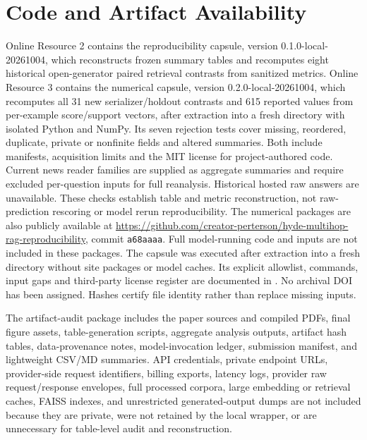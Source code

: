 \documentclass[pdflatex,sn-basic,Numbered]{sn-jnl}
\begin{document}
\FloatBarrier
\section{Code and Artifact Availability}
\label{sec:supp_code_artifact_availability}

Online Resource 2 contains the reproducibility capsule, version 0.1.0-local-20261004, which reconstructs frozen summary tables and recomputes eight historical open-generator paired retrieval contrasts from sanitized metrics. Online Resource 3 contains the numerical capsule, version 0.2.0-local-20261004, which recomputes all 31 new serializer/holdout contrasts and 615 reported values from per-example score/support vectors, after extraction into a fresh directory with isolated Python and NumPy. Its seven rejection tests cover missing, reordered, duplicate, private or nonfinite fields and altered summaries. Both include manifests, acquisition limits and the MIT license for project-authored code. Current news reader families are supplied as aggregate summaries and require excluded per-question inputs for full reanalysis. Historical hosted raw answers are unavailable. These checks establish table and metric reconstruction, not raw-prediction rescoring or model rerun reproducibility. The numerical packages are also publicly available at \url{https://github.com/creator-perterson/hyde-multihop-rag-reproducibility}, commit \texttt{a68aaaa}. Full model-running code and inputs are not included in these packages. The capsule was executed after extraction into a fresh directory without site packages or model caches. Its explicit allowlist, commands, input gaps and third-party license register are documented in . No archival DOI has been assigned. Hashes certify file identity rather than replace missing inputs.

The artifact-audit package includes the paper sources and compiled PDFs, final figure assets, table-generation scripts, aggregate analysis outputs, artifact hash tables, data-provenance notes, model-invocation ledger, submission manifest, and lightweight CSV/MD summaries. API credentials, private endpoint URLs, provider-side request identifiers, billing exports, latency logs, provider raw request/response envelopes, full processed corpora, large embedding or retrieval caches, FAISS indexes, and unrestricted generated-output dumps are not included because they are private, were not retained by the local wrapper, or are unnecessary for table-level audit and reconstruction.
\end{document}
